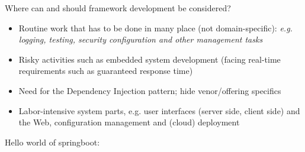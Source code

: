 Where can and should framework development be considered?
\begin{itemize}
  \item Routine work that has to be done in many place (not domain-specific): \textit{e.g. logging, testing, security configuration and other management tasks}
  \item Risky activities such as embedded system development (facing real-time requirements such as guaranteed response time)
  \item Need for the Dependency Injection pattern; hide venor/offering specifics
  \item Labor-intensive system parts, e.g. user interfaces (server side, client side) and the Web, configuration management and (cloud) deployment
\end{itemize}

Hello world of springboot:

